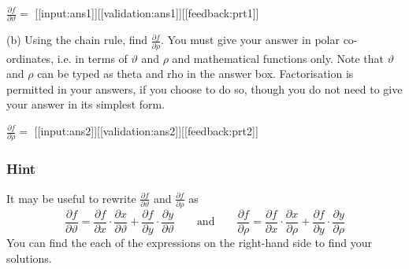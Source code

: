 \documentclass[a4paper,10pt]{article}
\begin{document}
\( \frac{\partial f}{\partial \vartheta} = \) [[input:ans1]][[validation:ans1]][[feedback:prt1]]

(b) Using the chain rule, find \( \frac{\partial f}{\partial \rho} \). You must give your answer in polar co-ordinates, i.e. in terms of \(\vartheta\) and $\rho$ and mathematical functions only. Note that \(\vartheta\) and $\rho$ can be typed as theta and rho in the answer box. Factorisation is permitted in your answers, if you choose to do so, though you do not need to give your answer in its simplest form.

\( \frac{\partial f}{\partial \rho} = \) [[input:ans2]][[validation:ans2]][[feedback:prt2]]
\subsubsection{Hint}
It may be useful to rewrite $\frac{\partial f}{\partial \vartheta}$ and $\frac{\partial f}{\partial \rho}$ as \[ \frac{\partial f}{\partial \vartheta} = \frac{\partial f}{\partial x}\cdot\frac{\partial x}{\partial \vartheta} + \frac{\partial f}{\partial y}\cdot\frac{\partial y}{\partial \vartheta} \qquad \text{and} \qquad \frac{\partial f}{\partial \rho} = \frac{\partial f}{\partial x}\cdot\frac{\partial x}{\partial \rho} + \frac{\partial f}{\partial y}\cdot\frac{\partial y}{\partial \rho} \] You can find the each of the expressions on the right-hand side to find your solutions.
\end{document}
